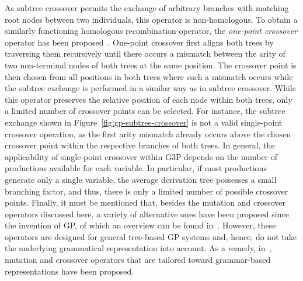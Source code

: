 As subtree crossover permits the exchange of arbitrary branches with matching root nodes between two individuals, this operator is non-homologous.
To obtain a similarly functioning homologous recombination operator, the \emph{one-point crossover} operator has been proposed~\cite{poli1998schema}.
One-point crossover first aligns both trees by traversing them recursively until there occurs a mismatch between the arity of two non-terminal nodes of both trees at the same position.
The crossover point is then chosen from all positions in both trees where such a mismatch occurs while the subtree exchange is performed in a similar way as in subtree crossover.
While this operator preserves the relative position of each node within both trees, only a limited number of crossover points can be selected.
For instance, the subtree exchange shown in Figure~\ref{fig:gp-subtree-crossover} is not a valid single-point crossover operation, as the first arity mismatch already occurs above the chosen crossover point within the respective branches of both trees.
In general, the applicability of single-point crossover within G3P depends on the number of productions available for each variable.
In particular, if most productions generate only a single variable, the average derivation tree possesses a small branching factor, and thus, there is only a limited number of possible crossover points.
Finally, it must be mentioned that, besides the mutation and crossover operators discussed here, a variety of alternative ones have been proposed since the invention of GP, of which an overview can be found in~\cite{poli2008field}.
However, these operators are designed for general tree-based GP systems and, hence, do not take the underlying grammatical representation into account. 
As a remedy, in~\cite{couchet2007crossover}, mutation and crossover operators that are tailored toward grammar-based representations have been proposed.

